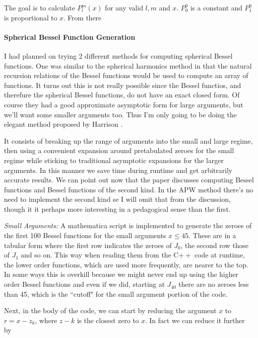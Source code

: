 \documentclass[11pt]{article}
\numberwithin{equation}{section}
\begin{document}
The goal is to calculate $P_l^m(x)$ for any valid $l,m$ and $x$. $P_0^0$ is a constant and $P_1^0$ is proportional to $x$. From there 

\paragraph{Spherical Bessel Function Generation}
I had planned on trying 2 different methods for computing spherical Bessel functions. One was similar to the spherical harmonics method in that the natural recursion relations of the Bessel functions would be used to compute an array of functions. It turns out this is not really possible since the Bessel functios, and therefure the spherical Bessel functions, do not have an exact closed form. Of course they had a good approximate asymptotic form for large arguments, but we'll want some smaller arguments too. Thus I'm only going to be doing the elegant method proposed by Harrison \cite{spherBessel}.

It consists of breaking up the range of arguments into the small and large regime, then using a convenient expansion around pretabulated zeroes for the small regime while sticking to traditional asymptotic expansions for the larger arguments. In this manner we save time during runtime and get arbitrarily accurate results. We can point out now that the paper discusses computing Bessel functions and Bessel functions of the second kind. In the APW method there's no need to implement the second kind se I will omit that from the discussion, though it it perhaps more interesting in a pedagogical sense than the first.

\textit{Small Arguments:} A mathematica script is implemented to generate the zeroes of the first 100 Bessel functions for the small arguments $x \leq 45$. These are in a tabular form where the first row indicates the zeroes of $J_0$, the second row those of $J_1$ and so on. This way when reading them from the C$++$ code at runtime, the lower order functions, which are used more frequently, are nearer to the top. In some ways this is overkill because we might never end up using the higher order Bessel functions and even if we did, starting at $J_{40}$ there are no zeroes less than 45, which is the ``cutoff" for the small argument portion of the code.

Next, in the body of the code, we can start by reducing the argument $x$ to $r = x - z_k$, where $z-k$ is the closest zero to $x$. In fact we can reduce it further by 
\end{document}
